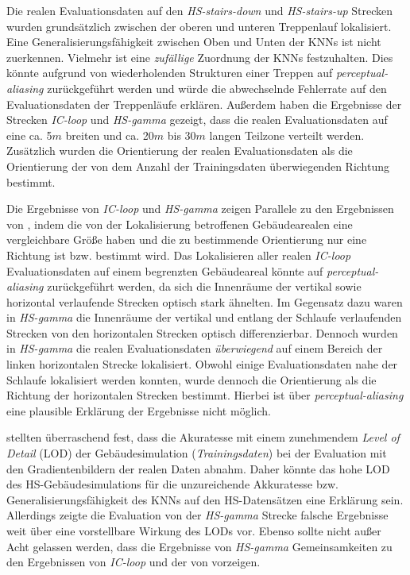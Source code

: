 Die realen Evaluationsdaten auf den \textit{HS-stairs-down} und \textit{HS-stairs-up} Strecken wurden grundsätzlich zwischen der oberen und unteren Treppenlauf lokalisiert. Eine Generalisierungsfähigkeit zwischen Oben und Unten der KNNs ist nicht zuerkennen. Vielmehr ist eine \textit{zufällige} Zuordnung der KNNs festzuhalten. Dies könnte aufgrund von wiederholenden Strukturen einer Treppen auf \textit{perceptual-aliasing} zurückgeführt werden und würde die abwechselnde Fehlerrate auf den Evaluationsdaten der Treppenläufe erklären.
Außerdem haben die Ergebnisse der Strecken \textit{IC-loop} und \textit{HS-gamma} gezeigt, dass die realen Evaluationsdaten auf eine ca. 5$m$ breiten und ca. 20$m$ bis 30$m$ langen Teilzone verteilt werden. Zusätzlich wurden die Orientierung der realen Evaluationsdaten als die Orientierung der von dem Anzahl der Trainingsdaten überwiegenden Richtung bestimmt. 


Die Ergebnisse von \textit{IC-loop} und \textit{HS-gamma} zeigen Parallele zu den Ergebnissen von \citet{acharyaBIMPoseNetIndoorCamera2019}, indem die von der Lokalisierung betroffenen Gebäudearealen eine vergleichbare Größe haben und die zu bestimmende Orientierung nur eine Richtung ist bzw. bestimmt wird.
Das Lokalisieren aller realen \textit{IC-loop} Evaluationsdaten auf einem begrenzten Gebäudeareal könnte auf \textit{perceptual-aliasing} zurückgeführt werden, da sich die Innenräume der vertikal sowie horizontal verlaufende Strecken optisch stark ähnelten. Im Gegensatz dazu waren in \textit{HS-gamma} die Innenräume der vertikal und entlang der Schlaufe verlaufenden Strecken von den horizontalen Strecken optisch differenzierbar. Dennoch wurden in \textit{HS-gamma} die realen Evaluationsdaten \textit{überwiegend} auf einem Bereich der linken horizontalen Strecke lokalisiert. Obwohl einige Evaluationsdaten nahe der Schlaufe lokalisiert werden konnten, wurde dennoch die Orientierung als die Richtung der horizontalen Strecken bestimmt. Hierbei ist über \textit{perceptual-aliasing} eine plausible Erklärung der Ergebnisse nicht möglich.

\citet{acharyaBIMPoseNetIndoorCamera2019} stellten überraschend fest, dass die Akuratesse mit einem zunehmendem \textit{Level of Detail} (LOD) der Gebäudesimulation (\textit{Trainingsdaten}) bei der Evaluation mit den Gradientenbildern der realen Daten abnahm. Daher könnte das hohe LOD des HS-Gebäudesimulations für die unzureichende Akkuratesse bzw. Generalisierungsfähigkeit des KNNs auf den HS-Datensätzen eine Erklärung sein. Allerdings zeigte die Evaluation von der \textit{HS-gamma} Strecke falsche Ergebnisse weit über eine vorstellbare Wirkung des LODs vor. Ebenso sollte nicht außer Acht gelassen werden, dass die Ergebnisse von \textit{HS-gamma} Gemeinsamkeiten zu den Ergebnissen von \textit{IC-loop} und der von \citet{acharyaBIMPoseNetIndoorCamera2019} vorzeigen.

